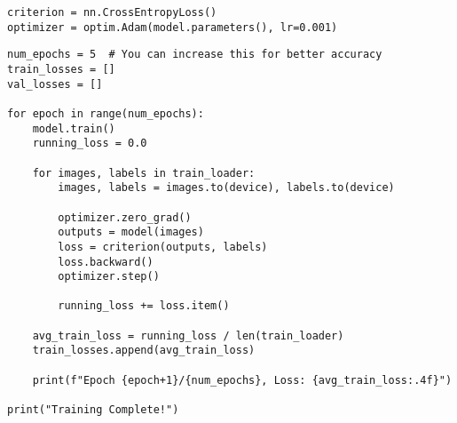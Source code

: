 \begin{verbatim}
criterion = nn.CrossEntropyLoss()
optimizer = optim.Adam(model.parameters(), lr=0.001)

\end{verbatim}

\begin{verbatim}
num_epochs = 5  # You can increase this for better accuracy
train_losses = []
val_losses = []

for epoch in range(num_epochs):
    model.train()
    running_loss = 0.0

    for images, labels in train_loader:
        images, labels = images.to(device), labels.to(device)

        optimizer.zero_grad()
        outputs = model(images)
        loss = criterion(outputs, labels)
        loss.backward()
        optimizer.step()

        running_loss += loss.item()

    avg_train_loss = running_loss / len(train_loader)
    train_losses.append(avg_train_loss)

    print(f"Epoch {epoch+1}/{num_epochs}, Loss: {avg_train_loss:.4f}")

print("Training Complete!")

\end{verbatim}

